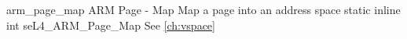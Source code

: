 %
%
%
%

\apidoc
{arm_page_map}
{ARM Page - Map} 
{Map a page into an address space}
{static inline int seL4\_ARM\_Page\_Map}
{
}
{\errorenumdesc}
{See \autoref{ch:vspace}}
